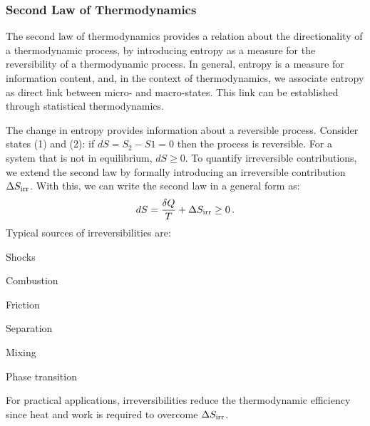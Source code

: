 \subsubsection{Second Law of Thermodynamics}
The second law of thermodynamics provides a relation about the directionality of a thermodynamic process, by introducing entropy as a measure for the reversibility of a thermodynamic process. In general, entropy is a measure for information content, and, in the context of thermodynamics, we associate entropy as direct link between micro- and macro-states. This link can be established through statistical thermodynamics. 

The change in entropy provides information about a reversible process. Consider states (1) and (2): if $dS = S_2 - S1=0$ then the process is reversible. For a system that is not in equilibrium, $d S \ge 0$. To quantify irreversible contributions, we extend the second law by formally introducing an irreversible contribution $\Delta S_{\rm{irr}}$. With this, we can write the second law in a general form as:
\begin{equation}
  dS = {\frac{\delta Q}{T}} + \Delta S_{\rm{irr}}\ge 0 \, \text{.}
\end{equation}
Typical sources of irreversibilities are:
\begin{itemizePacked}
 \item Shocks
 \item Combustion
 \item Friction
 \item Separation
 \item Mixing
 \item Phase transition
\end{itemizePacked}
For practical applications, irreversibilities reduce the thermodynamic efficiency since heat and work is required to overcome $\Delta S_{\rm{irr}}$.
